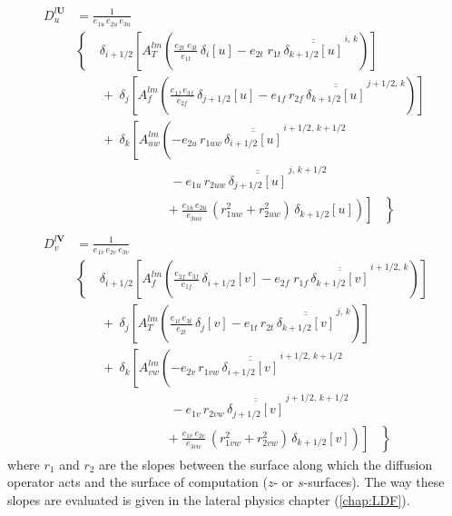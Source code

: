 \documentclass[../main/NEMO_manual]{subfiles}
\begin{document}
\begin{equation}
  \label{eq:DYN_ldf_iso}
  \begin{split}
    D_u^{l\textbf{U}} &= \frac{1}{e_{1u} \, e_{2u} \, e_{3u} }	\\
    &  \left\{\quad  {\delta_{i+1/2} \left[ {A_T^{lm}  \left(
              {\frac{e_{2t} \; e_{3t} }{e_{1t} } \,\delta_{i}[u]
                -e_{2t} \; r_{1t} \,\overline{\overline {\delta_{k+1/2}[u]}}^{\,i,\,k}}
            \right)} \right]} 	\right. \\
    & \qquad +\ \delta_j \left[ {A_f^{lm} \left( {\frac{e_{1f}\,e_{3f} }{e_{2f}
            }\,\delta_{j+1/2} [u] - e_{1f}\, r_{2f}
            \,\overline{\overline {\delta_{k+1/2} [u]}} ^{\,j+1/2,\,k}}
        \right)} \right] \\
    &\qquad +\ \delta_k \left[ {A_{uw}^{lm} \left( {-e_{2u} \, r_{1uw} \,\overline{\overline
              {\delta_{i+1/2} [u]}}^{\,i+1/2,\,k+1/2} }
        \right.} \right. \\
    &  \ \qquad \qquad \qquad \quad\
    - e_{1u} \, r_{2uw} \,\overline{\overline {\delta_{j+1/2} [u]}} ^{\,j,\,k+1/2} \\
    & \left. {\left. { \ \qquad \qquad \qquad \ \ \ \left. {\
                +\frac{e_{1u}\, e_{2u} }{e_{3uw} }\,\left( {r_{1uw}^2+r_{2uw}^2}
                \right)\,\delta_{k+1/2} [u]} \right)} \right]\;\;\;} \right\} \\ \\
    D_v^{l\textbf{V}} &= \frac{1}{e_{1v} \, e_{2v} \, e_{3v} } \\
    &  \left\{\quad  {\delta_{i+1/2} \left[ {A_f^{lm}  \left(
              {\frac{e_{2f} \; e_{3f} }{e_{1f} } \,\delta_{i+1/2}[v]
                -e_{2f} \; r_{1f} \,\overline{\overline {\delta_{k+1/2}[v]}}^{\,i+1/2,\,k}}
            \right)} \right]} 	\right. \\
    & \qquad +\ \delta_j \left[ {A_T^{lm} \left( {\frac{e_{1t}\,e_{3t} }{e_{2t}
            }\,\delta_{j} [v] - e_{1t}\, r_{2t}
            \,\overline{\overline {\delta_{k+1/2} [v]}} ^{\,j,\,k}}
        \right)} \right] \\
    & \qquad +\ \delta_k \left[ {A_{vw}^{lm} \left( {-e_{2v} \, r_{1vw} \,\overline{\overline
              {\delta_{i+1/2} [v]}}^{\,i+1/2,\,k+1/2} }\right.} \right. \\
    &  \ \qquad \qquad \qquad \quad\
    - e_{1v} \, r_{2vw} \,\overline{\overline {\delta_{j+1/2} [v]}} ^{\,j+1/2,\,k+1/2} \\
    & \left. {\left. { \ \qquad \qquad \qquad \ \ \ \left. {\
                +\frac{e_{1v}\, e_{2v} }{e_{3vw} }\,\left( {r_{1vw}^2+r_{2vw}^2}
                \right)\,\delta_{k+1/2} [v]} \right)} \right]\;\;\;} \right\}
  \end{split}
\end{equation}
where $r_1$ and $r_2$ are the slopes between the surface along which the diffusion operator acts and
the surface of computation ($z$- or $s$-surfaces).
The way these slopes are evaluated is given in the lateral physics chapter (\autoref{chap:LDF}).
\end{document}
